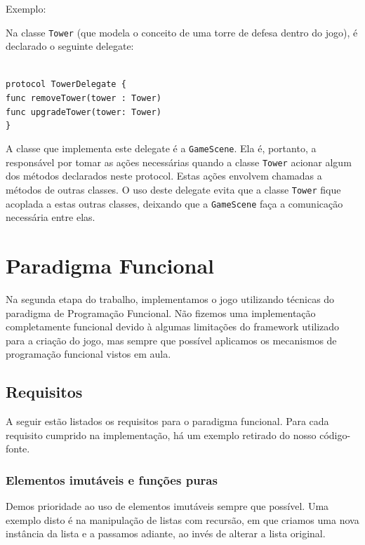 \documentclass[rel_mlp]{iiufrgs}
\newcommand\tab[1][1cm]{\hspace*{#1}}
\begin{document}
Exemplo:

Na classe \texttt{Tower} (que modela o conceito de uma torre de defesa dentro do jogo), é declarado o seguinte delegate:

\texttt{\\ protocol TowerDelegate \{\\\tab func removeTower(tower : Tower)\\\tab func upgradeTower(tower: Tower)\\\}}

A classe que implementa este delegate é a \texttt{GameScene}. Ela é, portanto, a responsável por tomar as ações necessárias quando a classe \texttt{Tower} acionar algum dos métodos declarados neste protocol. Estas ações envolvem chamadas a métodos de outras classes. O uso deste delegate evita que a classe \texttt{Tower} fique acoplada a estas outras classes, deixando que a \texttt{GameScene} faça a comunicação necessária entre elas.

%
\section{Paradigma Funcional}

Na segunda etapa do trabalho, implementamos o jogo utilizando técnicas do paradigma de Programação Funcional. Não fizemos uma implementação completamente funcional devido à algumas limitações do framework utilizado para a criação do jogo, mas sempre que possível aplicamos os mecanismos de programação funcional vistos em aula.


\subsection{Requisitos}

A seguir estão listados os requisitos para o paradigma funcional. Para cada requisito cumprido na implementação, há um exemplo retirado do nosso código-fonte.


\subsubsection{Elementos imutáveis e funções puras}

Demos prioridade ao uso de elementos imutáveis sempre que possível. Uma exemplo disto é na manipulação de listas com recursão, em que criamos uma nova instância da lista e a passamos adiante, ao invés de alterar a lista original.
\end{document}
